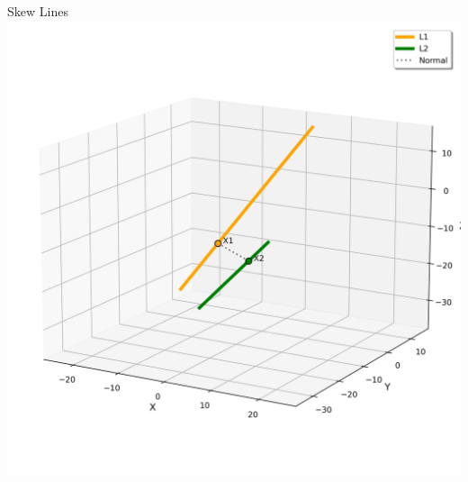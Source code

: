\documentclass{beamer}
\begin{document}
\begin{frame}{Skew Lines}
   \centering
    \includegraphics[width=\columnwidth, height=0.8\textheight, keepaspectratio]{figs/fig1.png}
    \label{fig:Beamer/figs/fig1.png}
\end{frame}
\end{document}
